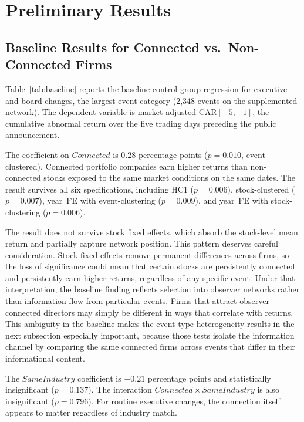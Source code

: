 \section{Preliminary Results}
\label{sec:results}

\subsection{Baseline Results for Connected vs.\ Non-Connected Firms}



Table~\ref{tab:baseline} reports the baseline control group regression for executive and board changes, the largest event category (2,348 events on the supplemented network). The dependent variable is market-adjusted CAR$[-5,-1]$, the cumulative abnormal return over the five trading days preceding the public announcement.

The coefficient on $Connected$ is 0.28 percentage points ($p=0.010$, event-clustered). Connected portfolio companies earn higher returns than non-connected stocks exposed to the same market conditions on the same dates. The result survives all six specifications, including HC1 ($p=0.006$), stock-clustered ($p=0.007$), year~FE with event-clustering ($p=0.009$), and year~FE with stock-clustering ($p=0.006$).

The result does not survive stock fixed effects, which absorb the stock-level mean return and partially capture network position. This pattern deserves careful consideration. Stock fixed effects remove permanent differences across firms, so the loss of significance could mean that certain stocks are persistently connected and persistently earn higher returns, regardless of any specific event. Under that interpretation, the baseline finding reflects selection into observer networks rather than information flow from particular events. Firms that attract observer-connected directors may simply be different in ways that correlate with returns. This ambiguity in the baseline makes the event-type heterogeneity results in the next subsection especially important, because those tests isolate the information channel by comparing the same connected firms across events that differ in their informational content.

The $SameIndustry$ coefficient is $-0.21$ percentage points and statistically insignificant ($p=0.137$). The interaction $Connected \times SameIndustry$ is also insignificant ($p=0.796$). For routine executive changes, the connection itself appears to matter regardless of industry match.

